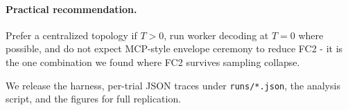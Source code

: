 \paragraph{Practical recommendation.}
Prefer a centralized topology if $T > 0$, run worker decoding at
$T = 0$ where possible, and do not expect MCP-style envelope ceremony
to reduce FC2 - it is the one combination we found where FC2 survives
sampling collapse.

We release the harness, per-trial JSON traces under \texttt{runs/*.json},
the analysis script, and the figures for full replication.
